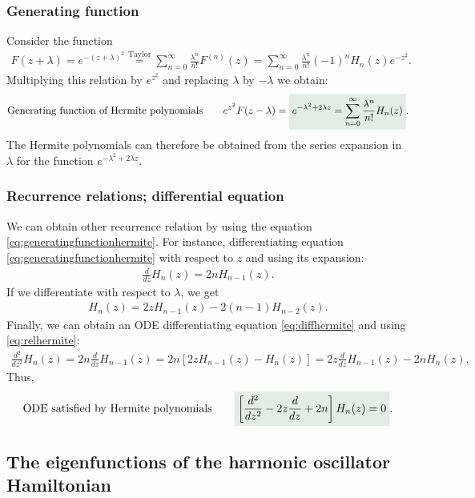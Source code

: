 \subsubsection{Generating function}
Consider the function 
\begin{align*}
    F(z+\lambda)=e^{-(z+\lambda)^2}\stackrel{\text{Taylor}}{=}\sum_{n=0}^\infty\frac{\lambda^n}{n!}F^{(n)}(z)=\sum_{n=0}^\infty\frac{\lambda^n}{n!}(-1)^nH_n(z)e^{-z^2}.
\end{align*}
Multiplying this relation by $e^{z^2}$ and replacing $\lambda$ by $-\lambda$ we obtain:
\begin{align}
    \text{Generating function of Hermite polynomials}\qquad e^{z^2}F(z-\lambda)=\highlight{e^{-\lambda^2+2\lambda z}=\sum_{n=0}^\infty\frac{\lambda^n}{n!}H_n(z)}.
    \label{eq:generatingfunctionhermite}
\end{align}
The Hermite polynomials can therefore be obtained from the series expansion in $\lambda$ for the function $e^{-\lambda^2+2\lambda z}$.
%
\subsubsection{Recurrence relations; differential equation}
We can obtain other recurrence relation by using the equation \eqref{eq:generatingfunctionhermite}. For instance, differentiating equation \eqref{eq:generatingfunctionhermite} with respect to 
$z$ and using its expansion:
\begin{align}
    \frac{d}{dz}H_n(z)=2nH_{n-1}(z).
    \label{eq:diffhermite}
\end{align} 
If we differentiate with respect to $\lambda$, we get 
\begin{align}
    H_n(z)=2zH_{n-1}(z)-2(n-1)H_{n-2}(z).
\end{align}
Finally, we can obtain an ODE differentiating equation \eqref{eq:diffhermite} and using \eqref{eq:relhermite}:
\begin{align*}
    \frac{d^2}{dz^2}H_n(z)=2n\frac{d}{dz}H_{n-1}(z)=2n[2zH_{n-1}(z)-H_n(z)]=2z\frac{d}{dz}H_{n-1}(z)-2nH_n(z),
\end{align*}
Thus,
\begin{align}
    \text{ODE satisfied by Hermite polynomials}\qquad\highlight{\left[\frac{d^2}{dz^2}-2z\frac{d}{dz}+2n\right]H_n(z)=0}.
\end{align}
\subsection{The eigenfunctions of the harmonic oscillator Hamiltonian}
%
